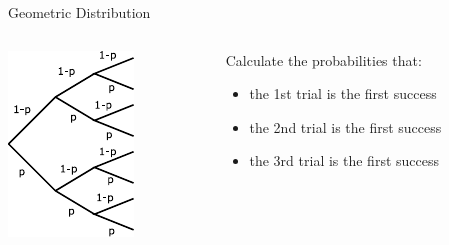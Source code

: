 \begin{frame}{Geometric Distribution}
    \begin{columns}
    \begin{column}{0.25\textwidth}
        \includegraphics[width=0.9\linewidth]{gfx/probability_tree}
    \end{column}
    \begin{column}{0.75\textwidth}
        \begin{example}
            \medskip
            Calculate the probabilities that:
            \begin{itemize}
                \item the 1st trial is the first success
                \item the 2nd trial is the first success
                \item the 3rd trial is the first success
            \end{itemize} 
        \end{example}
    \end{column}
    \end{columns}
\end{frame}

